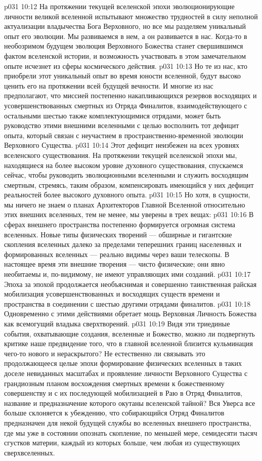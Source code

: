 \vs p031 10:12 На протяжении текущей вселенской эпохи эволюционирующие личности великой вселенной испытывают множество трудностей в силу неполной актуализации владычества Бога Верховного, но все мы разделяем уникальный опыт его эволюции. Мы развиваемся в нем, а он развивается в нас. Когда\hyp{}то в необозримом будущем эволюция Верховного Божества станет свершившимся фактом вселенской истории, и возможность участвовать в этом замечательном опыте исчезнет из сферы космического действия.
\vs p031 10:13 Но те из нас, кто приобрели этот уникальный опыт во время юности вселенной, будут высоко ценить его на протяжении всей будущей вечности. И многие из нас предполагают, что миссией постепенно накапливающихся резервов восходящих и усовершенствованных смертных из Отряда Финалитов, взаимодействующего с остальными шестью также комплектующимися отрядами, может быть руководство этими внешними вселенными с целью восполнить тот дефицит опыта, который связан с неучастием в пространственно\hyp{}временной эволюции Верховного Существа.
\vs p031 10:14 Этот дефицит неизбежен на всех уровнях вселенского существования. На протяжении текущей вселенской эпохи мы, находящиеся на более высоком уровне духовного существования, спускаемся сейчас, чтобы руководить эволюционными вселенными и служить восходящим смертным, стремясь, таким образом, компенсировать имеющийся у них дефицит реальностей более высокого духовного опыта.
\vs p031 10:15 Но хотя, в сущности, мы ничего не знаем о планах Архитекторов Главной Вселенной относительно этих внешних вселенных, тем не менее, мы уверены в трех вещах:
\vs p031 10:16 \bibnobreakspace В сферах внешнего пространства постепенно формируется огромная система вселенных. Новые типы физических творений --- обширные и гигантские скопления вселенных далеко за пределами теперешних границ населенных и формированных вселенных --- реально видимы через ваши телескопы. В настоящее время эти внешние творения --- чисто физические; они явно необитаемы и, по\hyp{}видимому, не имеют управляющих ими созданий.
\vs p031 10:17 \pc {}\bibnobreakspace Эпоха за эпохой продолжается необъяснимая и совершенно таинственная райская мобилизация усовершенствованных и восходящих существ времени и пространства в соединении с шестью другими отрядами финалитов.
\vs p031 10:18 \pc {}\bibnobreakspace Одновременно с этими действиями обретает мощь Верховная Личность Божества как всемогущий владыка сверхтворений.
\vs p031 10:19 \pc Видя эти триединые события, охватывающие создания, вселенные и Божество, можно ли подвергнуть критике наше предвидение того, что в главной вселенной близится кульминация чего\hyp{}то нового и нераскрытого? Не естественно ли связывать это продолжающееся целые эпохи формирование физических вселенных в таких доселе невиданных масштабах и проявление личности Верховного Существа с грандиозным планом восхождения смертных времени к божественному совершенству и с их последующей мобилизацией в Раю в Отряд Финалитов, название и предназначение которого окутаны вселенской тайной? Вся Уверса все больше склоняется к убеждению, что собирающийся Отряд Финалитов предназначен для некой будущей службы во вселенных внешнего пространства, где мы уже в состоянии опознать скопление, по меньшей мере, семидесяти тысяч сгустков материи, каждый из которых больше, чем любая из существующих сверхвселенных.
